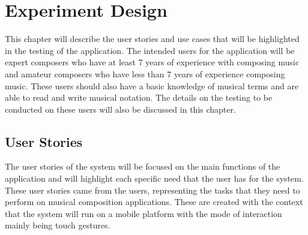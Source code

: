 \section{Experiment Design}

This chapter will describe the user stories and use cases that will be highlighted in the testing of the application. The intended users for the application will be expert composers who have at least 7 years of experience with composing music and amateur composers who have less than 7 years of experience composing music. These users should also have a basic knowledge of musical terms and are able to read and write musical notation. The details on the testing to be conducted on these users will also be discussed in this chapter.

\subsection{User Stories}
The user stories of the system will be focused on the main functions of the application and will highlight each specific need that the user has for the system. These user stories came from the users, representing the tasks that they need to perform on musical composition applications. These are created with the context that the system will run on a mobile platform with the mode of interaction mainly being touch gestures. 

